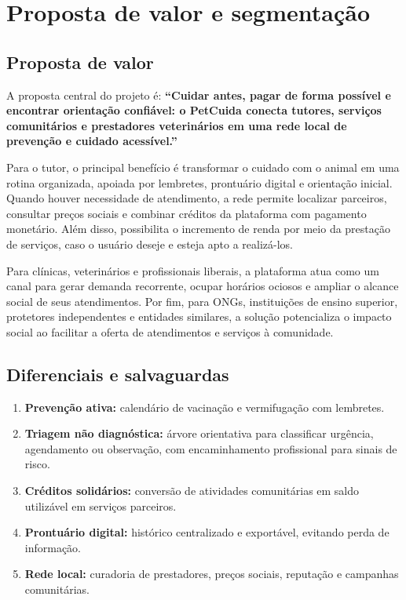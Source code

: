 \documentclass[12pt,a4paper]{article}
\begin{document}
\section{Proposta de valor e segmentação}
\subsection{Proposta de valor}
A proposta central do projeto é: \textbf{``Cuidar antes, pagar de forma possível e encontrar orientação confiável: o PetCuida conecta tutores, serviços comunitários e prestadores veterinários em uma rede local de prevenção e cuidado acessível.''}

Para o tutor, o principal benefício é transformar o cuidado com o animal em uma rotina organizada, apoiada por lembretes, prontuário digital e orientação inicial. Quando houver necessidade de atendimento, a rede permite localizar parceiros, consultar preços sociais e combinar créditos da plataforma com pagamento monetário. Além disso, possibilita o incremento de renda por meio da prestação de serviços, caso o usuário deseje e esteja apto a realizá-los.

Para clínicas, veterinários e profissionais liberais, a plataforma atua como um canal para gerar demanda recorrente, ocupar horários ociosos e ampliar o alcance social de seus atendimentos. Por fim, para ONGs, instituições de ensino superior, protetores independentes e entidades similares, a solução potencializa o impacto social ao facilitar a oferta de atendimentos e serviços à comunidade.


\subsection{Diferenciais e salvaguardas}
\begin{enumerate}[leftmargin=*]
  \item \textbf{Prevenção ativa:} calendário de vacinação e vermifugação com lembretes.
  \item \textbf{Triagem não diagnóstica:} árvore orientativa para classificar urgência, agendamento ou observação, com encaminhamento profissional para sinais de risco.
  \item \textbf{Créditos solidários:} conversão de atividades comunitárias em saldo utilizável em serviços parceiros.
  \item \textbf{Prontuário digital:} histórico centralizado e exportável, evitando perda de informação.
  \item \textbf{Rede local:} curadoria de prestadores, preços sociais, reputação e campanhas comunitárias.
\end{enumerate}
\end{document}
